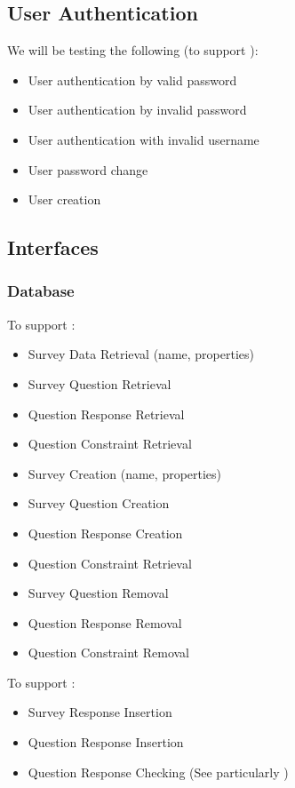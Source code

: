 \documentclass[10pt]{article}
\begin{document}
\subsection{User Authentication}

We will be testing the following (to support ):

\begin{itemize}
\item User authentication by valid password
\item User authentication by invalid password
\item User authentication with invalid username
\item User password change
\item User creation
\end{itemize}

\subsection{Interfaces}

\subsubsection{Database}

To support :

\begin{itemize}
\item Survey Data Retrieval (name, properties)
\item Survey Question Retrieval
\item Question Response Retrieval
\item Question Constraint Retrieval
\item Survey Creation (name, properties)
\item Survey Question Creation
\item Question Response Creation
\item Question Constraint Retrieval
\item Survey Question Removal
\item Question Response Removal
\item Question Constraint Removal
\end{itemize}

To support :

\begin{itemize}
\item Survey Response Insertion
\item Question Response Insertion
\item Question Response Checking (See particularly )
\end{itemize}
\end{document}
